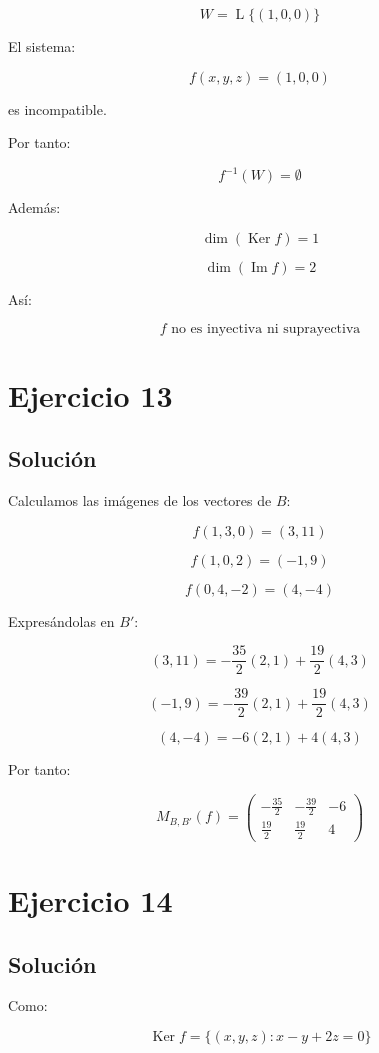 \documentclass[11pt,a4paper]{article}
\newcommand{\Ker}{\operatorname{Ker}}
\newcommand{\Ima}{\operatorname{Im}}
\newcommand{\Span}{\operatorname{L}}
\begin{document}
	\[
	W=\Span\{(1,0,0)\}
	\]

	El sistema:

	\[
	f(x,y,z)=(1,0,0)
	\]

	es incompatible.

	Por tanto:

	\[
	\boxed{
	f^{-1}(W)=\emptyset
	}
	\]

	Además:

	\[
	\dim(\Ker f)=1
	\]

	\[
	\dim(\Ima f)=2
	\]

	Así:

	\[
	\boxed{
	f\text{ no es inyectiva ni suprayectiva}
	}
	\]

\section{Ejercicio 13}
	\subsection{Solución}

	Calculamos las imágenes de los vectores de $B$:

	\[
	f(1,3,0)=(3,11)
	\]

	\[
	f(1,0,2)=(-1,9)
	\]

	\[
	f(0,4,-2)=(4,-4)
	\]

	Expresándolas en $B'$:

	\[
	(3,11)
	=
	-\frac{35}{2}(2,1)
	+
	\frac{19}{2}(4,3)
	\]

	\[
	(-1,9)
	=
	-\frac{39}{2}(2,1)
	+
	\frac{19}{2}(4,3)
	\]

	\[
	(4,-4)
	=
	-6(2,1)+4(4,3)
	\]

	Por tanto:

	\[
	\boxed{
	M_{B,B'}(f)
	=
	\begin{pmatrix}
	-\frac{35}{2}&-\frac{39}{2}&-6\\
	\frac{19}{2}&\frac{19}{2}&4
	\end{pmatrix}
	}
	\]

\section{Ejercicio 14}
	\subsection{Solución}

	Como:

	\[
	\Ker f
	=
	\{(x,y,z):x-y+2z=0\}
	\]
\end{document}
